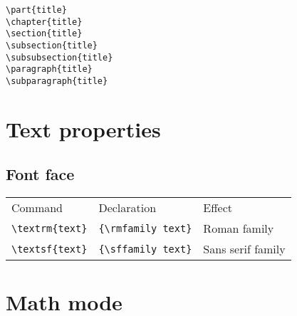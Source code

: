 \documentclass[10pt]{article}
\begin{document}
\begin{multicols}{3}
\begin{multicols*}{2}
\lstinline|\part{title}| \\
\lstinline|\chapter{title}| \\
\lstinline|\section{title}| \\
\lstinline|\subsection{title}| \\
\lstinline|\subsubsection{title}| \\
\lstinline|\paragraph{title}| \\
\lstinline|\subparagraph{title}|
\end{multicols*}

\section{Text properties}

\subsection{Font face}

\begin{tabular}{lll}
Command & Declaration & Effect \\
\lstinline|\textrm{text}| & \lstinline|{\rmfamily text}| & \textrm{Roman family} \\
\lstinline|\textsf{text}| & \lstinline|{\sffamily text}| & \textsf{Sans serif family} \\
\end{tabular}

\section{Math mode}


\end{multicols}
\end{document}
